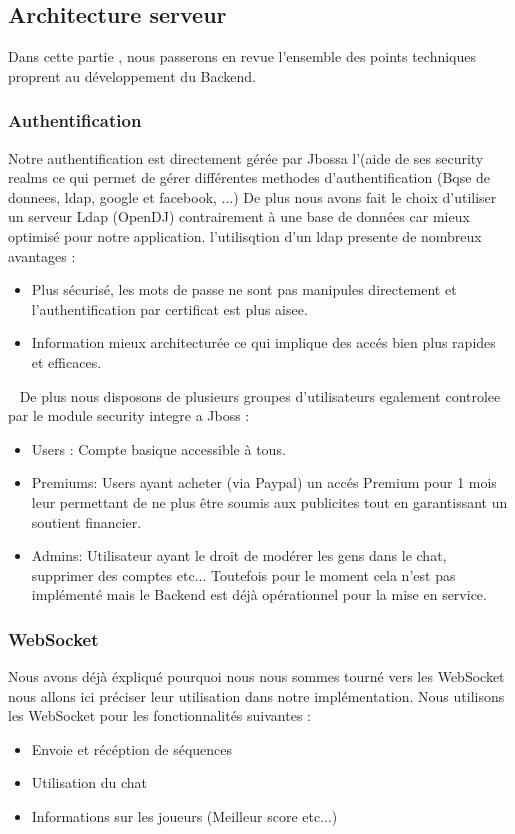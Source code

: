\documentclass[12pt]{article}
\begin{document}
\newpage
\subsection{Architecture serveur}
Dans cette partie , nous passerons en revue l'ensemble des points techniques proprent au développement du Backend.
\subsubsection{Authentification}
Notre authentification est directement gérée par Jbossa l'(aide de ses security realms ce qui permet de gérer différentes methodes d'authentification (Bqse de donnees, ldap, google et facebook, ...)
De plus nous avons fait le choix d'utiliser un serveur Ldap (OpenDJ) contrairement à une base de données car mieux optimisé pour notre application. l'utilisqtion d'un ldap presente de nombreux avantages :
\begin{itemize}
\item Plus sécurisé, les mots de passe ne sont pas manipules directement et l'authentification par certificat est plus aisee.
\item Information mieux architecturée ce qui implique des accés bien plus rapides et efficaces.
\end{itemize}
~\newline
De plus nous disposons de plusieurs groupes d'utilisateurs egalement controlee par le module security integre a Jboss :
\begin{itemize}
\item Users : Compte basique accessible à tous.
\item Premiums: Users ayant acheter (via Paypal) un accés Premium pour 1 mois leur permettant de ne plus être soumis aux publicites tout en garantissant un soutient financier.
\item Admins: Utilisateur ayant le droit de modérer les gens dans le chat, supprimer des comptes etc... Toutefois pour le moment cela n'est pas implémenté mais le Backend est déjà opérationnel pour la mise en service.
\end{itemize} 
\subsubsection{WebSocket}
Nous avons déjà éxpliqué pourquoi nous nous sommes tourné vers les WebSocket nous allons ici préciser leur utilisation dans notre implémentation. 
Nous utilisons les WebSocket pour les fonctionnalités suivantes :
\begin{itemize}
\item Envoie et récéption de séquences
\item Utilisation du chat
\item Informations sur les joueurs (Meilleur score etc...)
\end{itemize}
~\newline 
\end{document}
